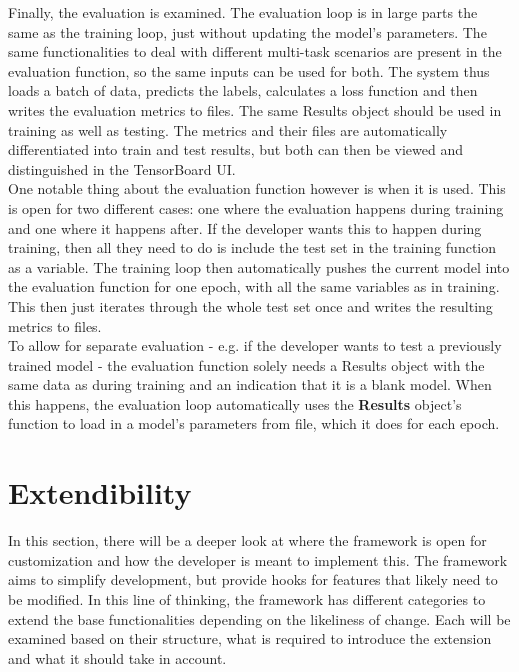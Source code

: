 Finally, the evaluation is examined. The evaluation loop is in large parts the same as the training loop, just without updating the model's parameters. The same functionalities to deal with different multi-task scenarios are present in the evaluation function, so the same inputs can be used for both. The system thus loads a batch of data, predicts the labels, calculates a loss function and then writes the evaluation metrics to files. The same Results object should be used in training as well as testing. The metrics and their files are automatically differentiated into train and test results, but both can then be viewed and distinguished in the TensorBoard UI. \\

One notable thing about the evaluation function however is when it is used. This is open for two different cases: one where the evaluation happens during training and one where it happens after. If the developer wants this to happen during training, then all they need to do is include the test set in the training function as a variable. The training loop then automatically pushes the current model into the evaluation function for one epoch, with all the same variables as in training. This then just iterates through the whole test set once and writes the resulting metrics to files. \\

To allow for separate evaluation - e.g. if the developer wants to test a previously trained model - the evaluation function solely needs a Results object with the same data as during training and an indication that it is a blank model. When this happens, the evaluation loop automatically uses the \textbf{Results} object's function to load in a model's parameters from file, which it does for each epoch. \\


\section{Extendibility} \label{Impl:Extendibility}

In this section, there will be a deeper look at where the framework is open for customization and how the developer is meant to implement this. The framework aims to simplify development, but provide hooks for features that likely need to be modified. In this line of thinking, the framework has different categories to extend the base functionalities depending on the likeliness of change. Each will be examined based on their structure, what is required to introduce the extension and what it should take in account. 

